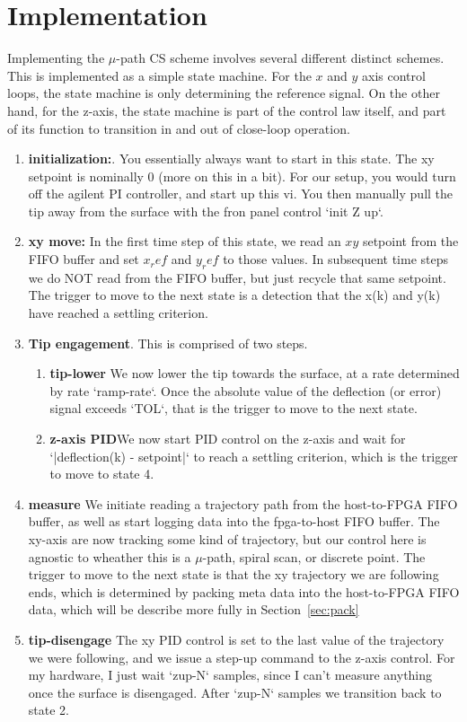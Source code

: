 \documentclass[letterpaper, 10 pt, conference]{ieeeconf}  %
\begin{document}
\section{Implementation}
Implementing the $\mu$-path CS scheme involves several different distinct schemes. This is implemented as a simple state machine. For the $x$ and $y$ axis control loops, the state machine is only determining the reference signal. On the other hand, for the z-axis, the state machine is part of the control law itself, and part of its function to transition in and out of close-loop operation. 
\begin{enumerate}
\item{\textbf{initialization:}. You essentially always want to start in this state. The xy setpoint is nominally 0 (more on this in a bit). For our setup, you would turn off the agilent PI controller, and start up this vi. You then manually pull the tip away from the surface with the fron panel control `init Z up`.}
\item{\textbf{xy move:} In the first time step of this state, we read an $xy$ setpoint from the FIFO buffer and set $x_ref$ and $y_ref$ to those values. In subsequent time steps we do NOT read from the FIFO buffer, but just recycle that same setpoint. The trigger to move to the next state is a detection that the x(k) and y(k) have reached a settling criterion.}
\item{\textbf{Tip engagement}. This is comprised of two steps.
    \begin{enumerate}
    \item{\textbf{tip-lower} We now lower the tip towards the surface, at a rate determined by rate `ramp-rate`. Once the absolute value of the deflection (or error) signal exceeds `TOL`, that is the trigger to move to the next state.}
      \item{\textbf{z-axis PID}We now start PID control on the z-axis and wait for `|deflection(k) - setpoint|` to reach a settling criterion, which is the trigger to move to state 4.}

    \end{enumerate}
    }
\item{\textbf{measure} We initiate reading a trajectory path from the host-to-FPGA FIFO buffer, as well as start logging data into the fpga-to-host FIFO buffer. The xy-axis are now tracking some kind of trajectory, but our control here is agnostic to wheather this is a $\mu$-path, spiral scan, or discrete point. The trigger to move to the next state is that the xy trajectory we are following ends, which is determined by packing meta data into the host-to-FPGA FIFO data, which will be describe more fully in Section~\ref{sec:pack}}
\item{\textbf{tip-disengage} The xy PID control is set to the last value of the trajectory we were following, and we issue a step-up command to the z-axis control. For my hardware, I just wait `zup-N` samples, since I can't measure anything once the surface is disengaged. After `zup-N` samples we transition back to state 2.}
\end{enumerate}
\end{document}
